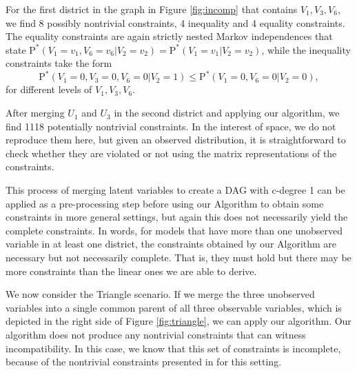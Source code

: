 \documentclass[12pt]{article}
\def\Pdo{{\mathrm{P}^*}}
\begin{document}
For the first district in the graph in Figure \ref{fig:incomp} that contains $V_1, V_3, V_6$, we find 8 possibly nontrivial constraints, 4 inequality and 4 equality constraints. The equality constraints are again strictly nested Markov independences that state $\Pdo(V_1 = v_1, V_6 = v_6| V_2 = v_2) = \Pdo(V_1 = v_1 | V_2 = v_2)$, while the inequality constraints take the form 
\[
\Pdo(V_1 = 0, V_3 = 0, V_6 = 0| V_2 = 1) \leq \Pdo(V_1 = 0, V_6 = 0| V_2 = 0),
\]
for different levels of $V_1, V_3, V_6$.

After merging $U_1$ and $U_3$ in the second district and applying our algorithm, we find 1118 potentially nontrivial constraints. In the interest of space, we do not reproduce them here, but given an observed distribution, it is straightforward to check whether they are violated or not using the matrix representations of the constraints. 

This process of merging latent variables to create a DAG with c-degree 1 can be applied as a pre-processing step before using our Algorithm to obtain some constraints in more general settings, but again this does not necessarily yield the complete constraints. In words, for models that have more than one unobserved variable in at least one district, the constraints obtained by our Algorithm are necessary but not necessarily complete. That is, they must hold but there may be more constraints than the linear ones we are able to derive. 

We now consider the Triangle scenario. If we merge the three unobserved variables into a single common parent of all three observable variables, which is depicted in the right side of Figure \ref{fig:triangle}, we can apply our algorithm. Our algorithm does not produce any nontrivial constraints that can witness incompatibility. In this case, we know that this set of constraints is incomplete, because of the nontrivial constraints presented in \citet{Wolfe_2019} for this setting. 
\end{document}
